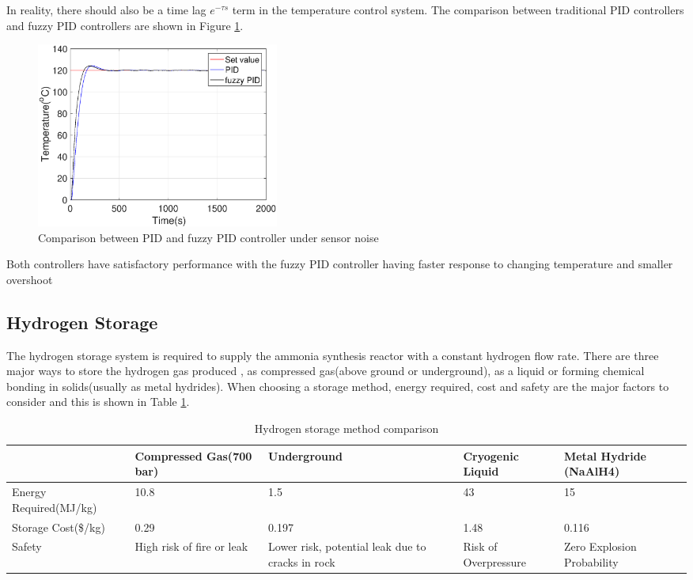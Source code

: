 \documentclass[11pt, a4paper]{article}
\begin{document}
In reality, there should also be a time lag $e^{-\tau s}$ term in the temperature control system. 
The comparison between traditional PID controllers and fuzzy PID controllers are shown in Figure \ref{fig:compare}.
\begin{figure}[H]
\centering
\includegraphics[width = 8cm]{pidpid.eps}
\caption{Comparison between PID and fuzzy PID controller under sensor noise}
\label{fig:compare}
\end{figure}
Both controllers have satisfactory performance with the fuzzy PID controller having faster response to changing temperature and smaller overshoot 



\subsection{Hydrogen  Storage }
The hydrogen storage system is required to supply the ammonia synthesis reactor with a constant hydrogen flow rate. There are three major ways to store the hydrogen gas produced , as compressed gas(above ground or underground), as a liquid or forming chemical bonding in solids(usually as metal hydrides).
When choosing a storage method, energy required, cost and safety are the major factors to consider and this is shown in Table \ref{tab:methods}.
\begin{singlespace}
\begin{table}[H]
\begin{tabular}{ |p{4.4cm}|p{2.4cm}|p{2.9cm}|p{3cm}| p{2.7cm}|} 
 \hline
  & Compressed Gas(700 bar) & Underground & Cryogenic Liquid   & Metal Hydride (NaAlH4) \\ 
 \hline
 Energy Required(MJ/kg) & 10.8  & 1.5  &43    & 15\\ 
 \hline
Storage Cost(\$/kg) & 0.29  & 0.197  &1.48 & 0.116\\ 
 \hline
 Safety & High risk of fire or leak & Lower risk, potential leak due to cracks in rock & Risk of Overpressure & Zero Explosion Probability \\
 \hline
\end{tabular}
\caption{\label{tab:methods}Hydrogen storage method comparison\cite{gas2}\cite{gas3}\cite{storage}\cite{storage2}}
\end{table}
\end{singlespace}
\end{document}
